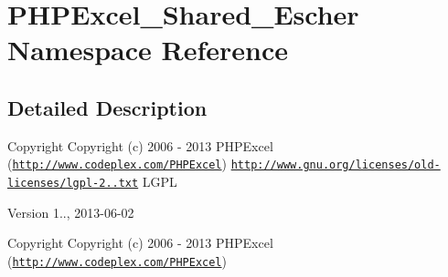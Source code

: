 \hypertarget{namespacePHPExcel__Shared__Escher}{}\section{P\+H\+P\+Excel\+\_\+\+Shared\+\_\+\+Escher Namespace Reference}
\label{namespacePHPExcel__Shared__Escher}


\subsection{Detailed Description}
\begin{DoxyCopyright}{Copyright}
Copyright (c) 2006 -\/ 2013 P\+H\+P\+Excel (\href{http://www.codeplex.com/PHPExcel}{\tt http\+://www.\+codeplex.\+com/\+P\+H\+P\+Excel})  \href{http://www.gnu.org/licenses/old-licenses/lgpl-2.1.txt}{\tt http\+://www.\+gnu.\+org/licenses/old-\/licenses/lgpl-\/2..\+txt} L\+G\+PL 
\end{DoxyCopyright}
\begin{DoxyVersion}{Version}
1.., 2013-\/06-\/02
\end{DoxyVersion}
\begin{DoxyCopyright}{Copyright}
Copyright (c) 2006 -\/ 2013 P\+H\+P\+Excel (\href{http://www.codeplex.com/PHPExcel}{\tt http\+://www.\+codeplex.\+com/\+P\+H\+P\+Excel}) 
\end{DoxyCopyright}
